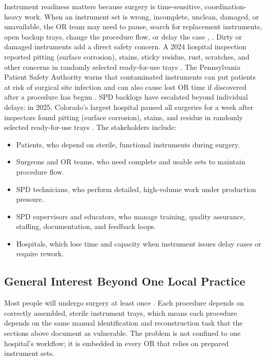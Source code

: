 \documentclass[10pt,a4paper]{article}
\begin{document}
Instrument readiness matters because surgery is time-sensitive,
coordination-heavy work. When an instrument set is wrong, incomplete, unclean,
damaged, or unavailable, the OR team may need to pause, search for replacement
instruments, open backup trays, change the procedure flow, or delay the case
\cite{nichol-et-al-2024},
\cite{pennsylvania-patient-safety-authority-2006}.
Dirty or damaged instruments add a direct safety concern. A 2024 hospital
inspection reported pitting (surface corrosion), stains, sticky residue, rust, scratches, and other
concerns in randomly selected ready-for-use trays
\cite{association-of-health-care-journalists-2024}.
The Pennsylvania Patient Safety Authority warns that contaminated instruments
can put patients at risk of surgical site infection and can also cause lost OR
time if discovered after a procedure has begun
\cite{pennsylvania-patient-safety-authority-2006}.
SPD backlogs have escalated beyond individual delays: in 2025, Colorado's
largest hospital paused all surgeries for a week after inspectors found pitting (surface corrosion),
stains, and residue in randomly selected ready-for-use trays
\cite{ingold-2025}.
The stakeholders include:
\begin{itemize}
  \item Patients, who depend on sterile, functional instruments during surgery.
  \item Surgeons and OR teams, who need complete and usable sets to maintain procedure flow.
  \item SPD technicians, who perform detailed, high-volume work under production pressure.
  \item SPD supervisors and educators, who manage training, quality assurance, staffing, documentation, and feedback loops.
  \item Hospitals, which lose time and capacity when instrument issues delay cases or require rework.
\end{itemize}
\subsection{General Interest Beyond One Local Practice}
\label{sec:general-interest-beyond-one-local-practice}

Most people will undergo surgery at least once \cite{abbott-et-al-2024}. Each
procedure depends on correctly assembled, sterile instrument trays, which
means each procedure depends on the same manual identification and
reconstruction task that the sections above document as vulnerable. The
problem is not confined to one hospital's workflow; it is embedded in every
OR that relies on prepared instrument sets.
\end{document}

